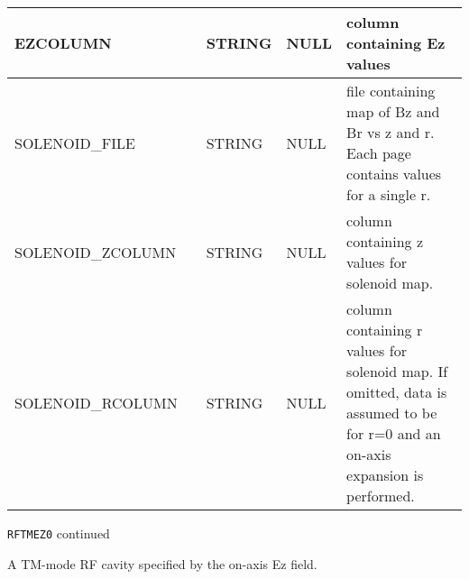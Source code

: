 \begin{tabular}{|l|l|l|l|p{\descwidth}|}
EZCOLUMN &  & STRING &   NULL            & column containing Ez values  \\ \hline 
SOLENOID\_FILE &  & STRING &   NULL            & file containing map of Bz and Br vs z and r.  Each page contains values for a single r.  \\ \hline 
SOLENOID\_ZCOLUMN &  & STRING &   NULL            & column containing z values for solenoid map.  \\ \hline 
SOLENOID\_RCOLUMN &  & STRING &   NULL            & column containing r values for solenoid map.  If omitted, data is assumed to be for r=0 and an on-axis expansion is performed.  \\ \hline 
\end{tabular}

\newpage
\begin{center}{\Large\verb|RFTMEZ0| continued}\end{center}
A TM-mode RF cavity specified by the on-axis Ez field.
\\
